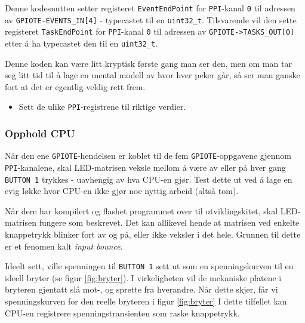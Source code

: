 Denne kodesnutten setter registeret \verb|EventEndPoint| for \verb|PPI|-kanal \verb|0| til adressen av \verb|GPIOTE-EVENTS_IN[4]| - typecastet til en \verb|uint32_t|. Tilsvarende vil den sette registeret \verb|TaskEndPoint| for \verb|PPI|-kanal \verb|0| til adressen av \verb|GPIOTE->TASKS_OUT[0]| etter å ha typecastet den til en \verb|uint32_t|.


Denne koden kan være litt kryptisk første gang man ser den, men om man tar seg litt tid til å lage en mental modell av hvor hver peker går, så ser man ganske fort at det er egentlig veldig rett frem. 

\begin{itemize}
    \item Sett de ulike \verb|PPI|-registrene til riktige verdier.
\end{itemize}


\subsubsection{Opphold CPU}

Når den ene \verb|GPIOTE|-hendelsen er koblet til de fem \verb|GPIOTE|-oppgavene gjennom \verb|PPI|-kanalene, skal LED-matrisen veksle mellom å være av eller på hver gang \verb|BUTTON 1| trykkes - uavhengig av hva CPU-en gjør. Test dette ut ved å lage en evig løkke hvor CPU-en ikke gjør noe nyttig arbeid (altså tom).

Når dere har kompilert og flashet programmet over til utviklingskitet, skal LED-matrisen fungere som beskrevet. Det kan allikevel hende at matrisen ved enkelte knappetrykk blinker fort av og på, eller ikke veksler i det hele. Grunnen til dette er et fenomen kalt \textit{input bounce}.

Ideelt sett, ville spenningen til \verb|BUTTON 1| sett ut som en spenningskurven til en ideell bryter (se figur \ref{fig:bryter}). I virkeligheten vil de mekaniske platene i bryteren gjentatt slå mot-, og sprette fra hverandre. Når dette skjer, får vi spenningskurven for den reelle bryteren i figur \ref{fig:bryter} I dette tilfellet kan CPU-en registrere spenningstransienten som raske knappetrykk.

